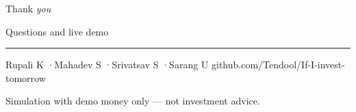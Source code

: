\documentclass[aspectratio=169,11pt]{beamer}
\begin{document}
\begin{frame}[plain]
  \vspace*{2.2cm}
  \hspace*{0.15cm}\begin{minipage}{0.9\textwidth}
    {\displayfont\fontsize{38}{40}\selectfont Thank \textit{you}\par}\vspace{0.3cm}
    {\fontsize{13}{16}\selectfont\color{muted}Questions and live demo\par}\vspace{0.7cm}
    {\color{rulec}\rule{\linewidth}{0.4pt}}\par\vspace{0.25cm}
    {\small\color{muted}Rupali K \enspace·\enspace Mahadev S \enspace·\enspace Srivatsav S \enspace·\enspace Sarang U \hfill github.com/Tendool/If-I-invest-tomorrow}\par\vspace{0.4cm}
    {\scriptsize\color{faint}Simulation with demo money only --- not investment advice.}
  \end{minipage}
\end{frame}
\end{document}
